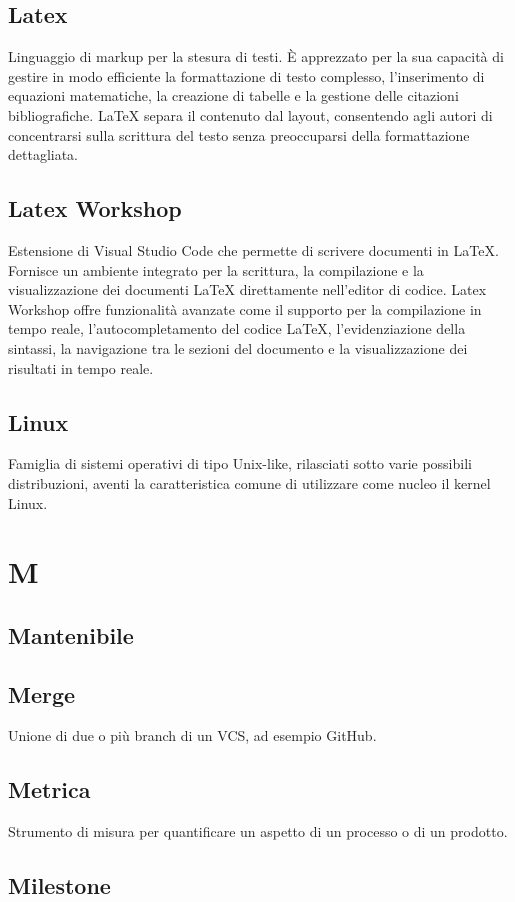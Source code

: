 \documentclass[12pt]{article}
\begin{document}
		\subsection{Latex}
		Linguaggio di markup per la stesura di testi. È apprezzato per la sua capacità di gestire in modo efficiente la formattazione di testo complesso, l'inserimento di equazioni matematiche, la creazione di tabelle e la gestione delle citazioni bibliografiche. LaTeX separa il contenuto dal layout, consentendo agli autori di concentrarsi sulla scrittura del testo senza preoccuparsi della formattazione dettagliata. 

		\subsection{Latex Workshop}
		Estensione di Visual Studio Code che permette di scrivere documenti in LaTeX. Fornisce un ambiente integrato per la scrittura, la compilazione e la visualizzazione dei documenti LaTeX direttamente nell'editor di codice. Latex Workshop offre funzionalità avanzate come il supporto per la compilazione in tempo reale, l'autocompletamento del codice LaTeX, l'evidenziazione della sintassi, la navigazione tra le sezioni del documento e la visualizzazione dei risultati in tempo reale.
		\subsection{Linux}
		Famiglia di sistemi operativi di tipo Unix-like, rilasciati sotto varie possibili distribuzioni, aventi la caratteristica comune di utilizzare come nucleo il kernel Linux.

	\clearpage
	\section{M}
		\subsection{Mantenibile}
		\subsection{Merge}
		Unione di due o più branch di un VCS, ad esempio GitHub.
		\subsection{Metrica}
		Strumento di misura per quantificare un aspetto di un processo o di un prodotto.
		\subsection{Milestone}
\end{document}
